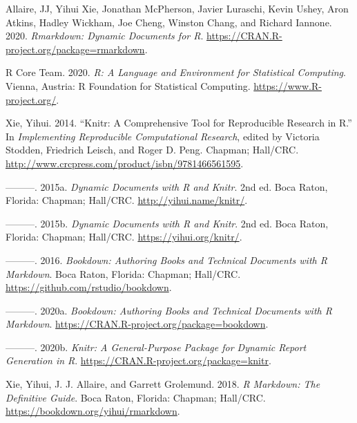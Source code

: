 \documentclass[
  lang=cn,
  11pt,
  scheme=chinese,
  chinesefont=nofont,
  bibstyle=apalike]{elegantbook}
\newlength{\cslhangindent}
\newenvironment{cslreferences}%
  {\setlength{\parindent}{0pt}%
  \everypar{\setlength{\hangindent}{\cslhangindent}}\ignorespaces}%
  {\par}
\begin{document}
\hypertarget{refs}{}
\begin{cslreferences}
\leavevmode\hypertarget{ref-R-rmarkdown}{}%
Allaire, JJ, Yihui Xie, Jonathan McPherson, Javier Luraschi, Kevin Ushey, Aron Atkins, Hadley Wickham, Joe Cheng, Winston Chang, and Richard Iannone. 2020. \emph{Rmarkdown: Dynamic Documents for R}. \url{https://CRAN.R-project.org/package=rmarkdown}.

\leavevmode\hypertarget{ref-R-base}{}%
R Core Team. 2020. \emph{R: A Language and Environment for Statistical Computing}. Vienna, Austria: R Foundation for Statistical Computing. \url{https://www.R-project.org/}.

\leavevmode\hypertarget{ref-knitr2014}{}%
Xie, Yihui. 2014. ``Knitr: A Comprehensive Tool for Reproducible Research in R.'' In \emph{Implementing Reproducible Computational Research}, edited by Victoria Stodden, Friedrich Leisch, and Roger D. Peng. Chapman; Hall/CRC. \url{http://www.crcpress.com/product/isbn/9781466561595}.

\leavevmode\hypertarget{ref-xie2015}{}%
---------. 2015a. \emph{Dynamic Documents with R and Knitr}. 2nd ed. Boca Raton, Florida: Chapman; Hall/CRC. \url{http://yihui.name/knitr/}.

\leavevmode\hypertarget{ref-knitr2015}{}%
---------. 2015b. \emph{Dynamic Documents with R and Knitr}. 2nd ed. Boca Raton, Florida: Chapman; Hall/CRC. \url{https://yihui.org/knitr/}.

\leavevmode\hypertarget{ref-bookdown2016}{}%
---------. 2016. \emph{Bookdown: Authoring Books and Technical Documents with R Markdown}. Boca Raton, Florida: Chapman; Hall/CRC. \url{https://github.com/rstudio/bookdown}.

\leavevmode\hypertarget{ref-R-bookdown}{}%
---------. 2020a. \emph{Bookdown: Authoring Books and Technical Documents with R Markdown}. \url{https://CRAN.R-project.org/package=bookdown}.

\leavevmode\hypertarget{ref-R-knitr}{}%
---------. 2020b. \emph{Knitr: A General-Purpose Package for Dynamic Report Generation in R}. \url{https://CRAN.R-project.org/package=knitr}.

\leavevmode\hypertarget{ref-rmarkdown2018}{}%
Xie, Yihui, J. J. Allaire, and Garrett Grolemund. 2018. \emph{R Markdown: The Definitive Guide}. Boca Raton, Florida: Chapman; Hall/CRC. \url{https://bookdown.org/yihui/rmarkdown}.
\end{cslreferences}
\end{document}
